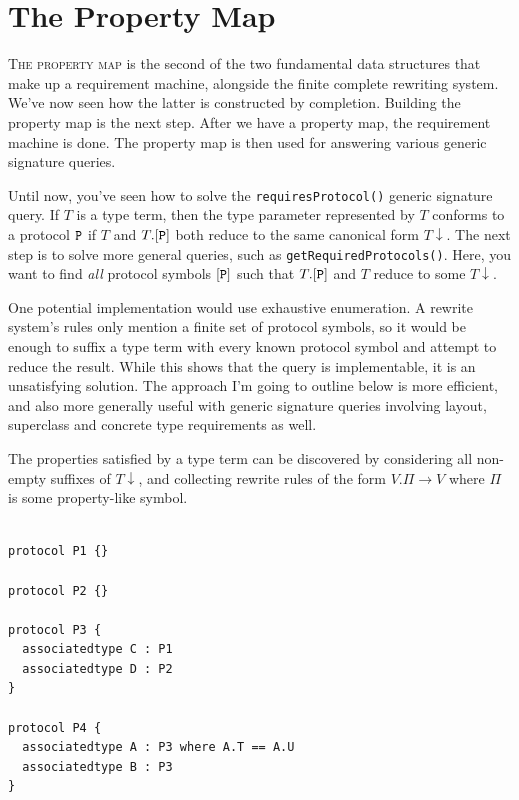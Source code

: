 \documentclass[../generics]{subfiles}
\begin{document}
\chapter{The Property Map}\label{chap:property map}

\lettrine{T}{he property map} is the second of the two fundamental data structures that make up a requirement machine, alongside the finite complete rewriting system. We've now seen how the latter is constructed by completion. Building the property map is the next step. After we have a property map, the requirement machine is done. The property map is then used for answering various generic signature queries.

Until now, you've seen how to solve the \texttt{requiresProtocol()} generic signature
query. If $T$ is a type term, then the type parameter represented by $T$ conforms to a protocol
$\texttt{P}$ if $T$ and $T.[\texttt{P}]$ both reduce to the same canonical form ${T}{\downarrow}$. The next
step is to solve more general queries, such as \texttt{getRequiredProtocols()}. Here, you want to find
\emph{all} protocol symbols $[\texttt{P}]$ such that $T.[\texttt{P}]$ and $T$ reduce to some
${T}{\downarrow}$.

One potential implementation would use exhaustive enumeration. A rewrite system's rules only mention a
finite set of protocol symbols, so it would be enough to suffix a type term with every known
protocol symbol and attempt to reduce the result. While this shows that the query is implementable,
it is an unsatisfying solution. The approach I'm going to outline below is more efficient, and also more generally useful with generic signature queries involving layout, superclass and concrete type requirements as well.

The properties satisfied by a type term can be discovered by
considering all non-empty suffixes of ${T}{\downarrow}$, and collecting rewrite rules of the form
$V.\Pi\rightarrow V$ where $\Pi$ is some property-like symbol.

\begin{listing}\label{propmaplisting1}
\begin{Verbatim}

protocol P1 {}

protocol P2 {}

protocol P3 {
  associatedtype C : P1
  associatedtype D : P2
}

protocol P4 {
  associatedtype A : P3 where A.T == A.U
  associatedtype B : P3
}
\end{Verbatim}
\end{listing}
\end{document}
